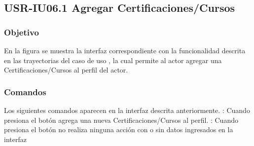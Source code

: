 \clearpage
\subsection{USR-IU06.1 Agregar Certificaciones/Cursos}

\subsubsection{Objetivo}
En la figura  se muestra la interfaz correspondiente con la funcionalidad descrita en las
trayectorias del caso de uso  , la cual permite al actor agregar una Certificaciones/Cursos al perfil del actor.

\subsubsection{Comandos}
Los siguientes comandos aparecen en la interfaz descrita anteriormente.
\Titem {} : Cuando presiona el botón agrega una nueva Certificaciones/Cursos al perfil.
\Titem {} : Cuando presiona el botón no realiza ninguna acción con o sin datos ingresados en la interfaz


\clearpage
